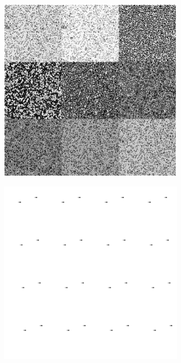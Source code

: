 \documentclass[12pt]{article}
\numberwithin{figure}{section} %
\begin{document}
\begin{figure}[H]
 \begin{subfigure}{0.45\textwidth}
     \centering
     \includegraphics[width=\linewidth]{Section3/3.1}
   \end{subfigure}
     \begin{subfigure}{0.53\textwidth}
     \centering
     \includegraphics[width=\linewidth]{Section3/3.2}

\end{subfigure}
\end{figure}
\end{document}
